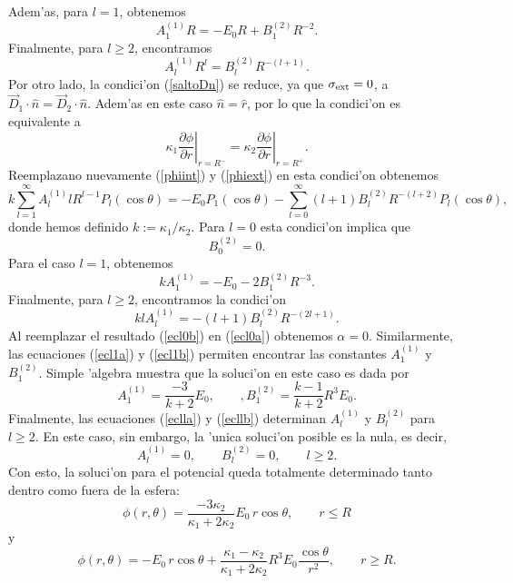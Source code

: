 Adem'as, para $l=1$, obtenemos
\begin{equation}\label{ecl1a}
 A_1^{(1)}R =-E_0R+B_1^{(2)}R^{-2}.
\end{equation}
Finalmente, para $l\geq2$, encontramos
\begin{equation}\label{eclla}
 A_l^{(1)}R^{l} =B_l^{(2)}R^{-(l+1)}.
\end{equation}
Por otro lado, la condici'on (\ref{saltoDn}) se reduce, ya que $\sigma_{\rm ext}=0$, a $\vec{D}_1\cdot\hat{n}=\vec{D}_2\cdot\hat{n}$. Adem'as en este caso $\hat{n}=\hat{r}$, por lo que la condici'on es equivalente a
\begin{equation}
\kappa_1\left.\frac{\partial\phi}{\partial r}\right|_{r=R^-}
=\kappa_2\left.\frac{\partial\phi}{\partial r}\right|_{r=R^+}.
\end{equation}
Reemplazano nuevamente (\ref{phiint}) y (\ref{phiext}) en esta condici'on obtenemos
\begin{equation}\label{condD}
 k\sum_{l=1}^{\infty}A_l^{(1)}lR^{l-1}P_l(\cos\theta) =-E_0P_1(\cos\theta)  -\sum_{l=0}^{\infty}(l+1)B_l^{(2)}R^{-(l+2)}P_l(\cos\theta),
\end{equation}
donde hemos definido $k:=\kappa_1/\kappa_2$. Para $l=0$ esta condici'on implica que
\begin{equation}\label{ecl0b}
B_0^{(2)}=0.
\end{equation}
Para el caso $l=1$, obtenemos
\begin{equation}\label{ecl1b}
kA_1^{(1)}  =-E_0-2B_1^{(2)}R^{-3}.
\end{equation}
Finalmente, para $l\geq2$, encontramos la condici'on
\begin{equation}\label{ecllb}
klA_l^{(1)} =-(l+1)B_l^{(2)}R^{-(2l+1)}.
\end{equation}
Al reemplazar el resultado (\ref{ecl0b}) en (\ref{ecl0a}) obtenemos $\alpha=0$. Similarmente, las ecuaciones (\ref{ecl1a}) y (\ref{ecl1b}) permiten encontrar las constantes $A_1^{(1)}$ y $B_1^{(2)}$. Simple 'algebra muestra que la soluci'on en este caso es dada por
\begin{equation}
 A_1^{(1)}=\frac{-3}{k+2}E_0, \qquad, B_1^{(2)}=\frac{k-1}{k+2}R^3E_0.
 \end{equation}
Finalmente, las ecuaciones (\ref{eclla}) y (\ref{ecllb}) determinan $A_l^{(1)}$ y $B_l^{(2)}$ para $l\ge 2$. En este caso, sin embargo, la 'unica soluci'on posible es la nula, es decir,
\begin{equation}
A_l^{(1)}=0, \qquad B_l^{(2)}=0, \qquad l\ge 2.
\end{equation}
Con esto, la soluci'on para el potencial queda totalmente determinado tanto dentro como fuera de la esfera:
\begin{equation}
\phi(r,\theta)=\frac{-3\kappa_2}{\kappa_1+2\kappa_2}E_0\,r\cos\theta, \qquad r\le R
\end{equation}
y
\begin{equation}
\phi(r,\theta)=-E_0\,r\cos\theta +\frac{\kappa_1-\kappa_2}{\kappa_1+2\kappa_2}R^3E_0 \frac{\cos\theta}{r^2}, \qquad r\ge R.
\end{equation}
 
